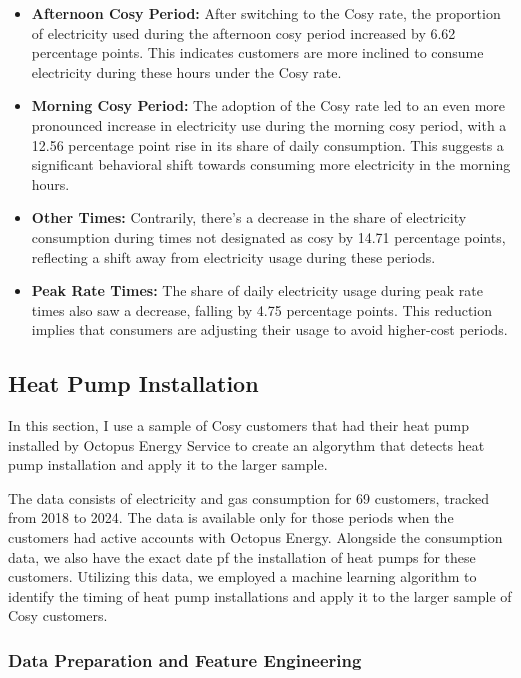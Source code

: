\documentclass[
]{article}
\providecommand{\tightlist}{%
  \setlength{\itemsep}{0pt}\setlength{\parskip}{0pt}}
\begin{document}
\begin{itemize}
\tightlist
\item
  \textbf{Afternoon Cosy Period:} After switching to the Cosy rate, the proportion of electricity used during the afternoon cosy period increased by 6.62 percentage points. This indicates customers are more inclined to consume electricity during these hours under the Cosy rate.
\item
  \textbf{Morning Cosy Period:} The adoption of the Cosy rate led to an even more pronounced increase in electricity use during the morning cosy period, with a 12.56 percentage point rise in its share of daily consumption. This suggests a significant behavioral shift towards consuming more electricity in the morning hours.
\item
  \textbf{Other Times:} Contrarily, there's a decrease in the share of electricity consumption during times not designated as cosy by 14.71 percentage points, reflecting a shift away from electricity usage during these periods.
\item
  \textbf{Peak Rate Times:} The share of daily electricity usage during peak rate times also saw a decrease, falling by 4.75 percentage points. This reduction implies that consumers are adjusting their usage to avoid higher-cost periods.
\end{itemize}



\subsection*{Heat Pump Installation}\label{heat-pump-installation}

In this section, I use a sample of Cosy customers that had their heat pump installed by Octopus Energy Service to create an algorythm that detects heat pump installation and apply it to the larger sample.

The data consists of electricity and gas consumption for 69 customers, tracked from 2018 to 2024. The data is available only for those periods when the customers had active accounts with Octopus Energy. Alongside the consumption data, we also have the exact date pf the installation of heat pumps for these customers. Utilizing this data, we employed a machine learning algorithm to identify the timing of heat pump installations and apply it to the larger sample of Cosy customers.

\subsubsection{Data Preparation and Feature Engineering}\label{data-preparation-and-feature-engineering}
\end{document}
